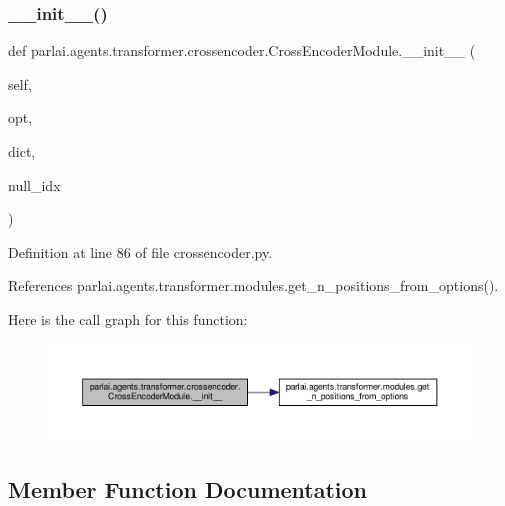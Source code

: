 \subsubsection{\texorpdfstring{\+\_\+\+\_\+init\+\_\+\+\_\+()}{\_\_init\_\_()}}
{\footnotesize\ttfamily def parlai.\+agents.\+transformer.\+crossencoder.\+Cross\+Encoder\+Module.\+\_\+\+\_\+init\+\_\+\+\_\+ (\begin{DoxyParamCaption}\item[{}]{self,  }\item[{}]{opt,  }\item[{}]{dict,  }\item[{}]{null\+\_\+idx }\end{DoxyParamCaption})}



Definition at line 86 of file crossencoder.\+py.



References parlai.\+agents.\+transformer.\+modules.\+get\+\_\+n\+\_\+positions\+\_\+from\+\_\+options().

Here is the call graph for this function\+:
\nopagebreak
\begin{figure}[H]
\begin{center}
\leavevmode
\includegraphics[width=350pt]{classparlai_1_1agents_1_1transformer_1_1crossencoder_1_1CrossEncoderModule_ad002e8a3432930432430e2b4c435cc3e_cgraph}
\end{center}
\end{figure}


\subsection{Member Function Documentation}
\mbox{\label{classparlai_1_1agents_1_1transformer_1_1crossencoder_1_1CrossEncoderModule_a86a9cf18bddebb5a1ee9c4096cfe7c20}} 
